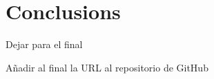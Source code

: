 \documentclass{llncs}
\begin{document}
%
\section{Conclusions}
\label{sec:conclusions}
%


Dejar para el final

Añadir al final la URL al repositorio de GitHub



\end{document}

